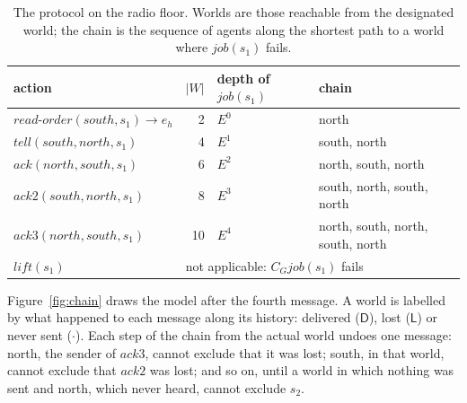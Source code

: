\documentclass[11pt,a4paper]{article}
\theoremstyle{definition}
\newcommand{\Cop}[1]{C_{#1}}
\newcommand{\ag}[1]{\mathit{#1}}
\newcommand{\job}{\mathit{job}}
\begin{document}
\begin{table}[H]
\centering\small
\caption{The protocol on the radio floor. Worlds are those reachable from the
designated world; the chain is the sequence of agents along the shortest path to
a world where $\job(s_1)$ fails.}
\label{tab:ladder}
\begin{tabular}{@{}l r l l@{}}
\toprule
action & $|W|$ & depth of $\job(s_1)$ & chain \\
\midrule
$\mathit{read\text{-}order}(\ag{south}, s_1) \to e_h$ & 2 & $E^0$ & north \\
$\mathit{tell}(\ag{south}, \ag{north}, s_1)$ & 4 & $E^1$ & south, north \\
$\mathit{ack}(\ag{north}, \ag{south}, s_1)$ & 6 & $E^2$ & north, south, north \\
$\mathit{ack2}(\ag{south}, \ag{north}, s_1)$ & 8 & $E^3$ & south, north, south, north \\
$\mathit{ack3}(\ag{north}, \ag{south}, s_1)$ & 10 & $E^4$ & north, south, north, south, north \\
$\mathit{lift}(s_1)$ & \multicolumn{3}{l}{not applicable: $\Cop{G}\job(s_1)$ fails} \\
\bottomrule
\end{tabular}
\end{table}

Figure~\ref{fig:chain} draws the model after the fourth message. A world is
labelled by what happened to each message along its history: delivered
($\mathsf{D}$), lost ($\mathsf{L}$) or never sent ($\cdot$). Each step of the
chain from the actual world undoes one message: north, the sender of
$\mathit{ack3}$, cannot exclude that it was lost; south, in that world, cannot
exclude that $\mathit{ack2}$ was lost; and so on, until a world in which
nothing was sent and north, which never heard, cannot exclude $s_2$.
\end{document}
